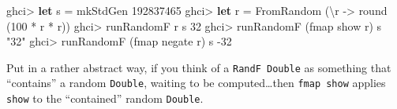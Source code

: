\documentclass[]{article}
\newenvironment{Shaded}{}{}
\newcommand{\KeywordTok}[1]{\textcolor[rgb]{0.00,0.44,0.13}{\textbf{{#1}}}}
\newcommand{\DataTypeTok}[1]{\textcolor[rgb]{0.56,0.13,0.00}{{#1}}}
\newcommand{\DecValTok}[1]{\textcolor[rgb]{0.25,0.63,0.44}{{#1}}}
\newcommand{\StringTok}[1]{\textcolor[rgb]{0.25,0.44,0.63}{{#1}}}
\newcommand{\OtherTok}[1]{\textcolor[rgb]{0.00,0.44,0.13}{{#1}}}
\newcommand{\FunctionTok}[1]{\textcolor[rgb]{0.02,0.16,0.49}{{#1}}}
\newcommand{\NormalTok}[1]{{#1}}
\begin{document}
\begin{Shaded}
\begin{Highlighting}[]
\NormalTok{ghci}\FunctionTok{>} \KeywordTok{let} \NormalTok{s }\FunctionTok{=} \NormalTok{mkStdGen }\DecValTok{192837465}
\NormalTok{ghci}\FunctionTok{>} \KeywordTok{let} \NormalTok{r }\FunctionTok{=} \DataTypeTok{FromRandom} \NormalTok{(\textbackslash{}r }\OtherTok{->} \NormalTok{round (}\DecValTok{100} \FunctionTok{*} \NormalTok{r }\FunctionTok{*} \NormalTok{r))}
\NormalTok{ghci}\FunctionTok{>} \NormalTok{runRandomF r s}
\DecValTok{32}
\NormalTok{ghci}\FunctionTok{>} \NormalTok{runRandomF (fmap show r) s}
\StringTok{"32"}
\NormalTok{ghci}\FunctionTok{>} \NormalTok{runRandomF (fmap negate r) s}
\FunctionTok{-}\DecValTok{32}
\end{Highlighting}
\end{Shaded}

Put in a rather abstract way, if you think of a \texttt{RandF\ Double}
as something that ``contains'' a random \texttt{Double}, waiting to be
computed\ldots{}then \texttt{fmap\ show} applies \texttt{show} to the
``contained'' random \texttt{Double}.
\end{document}
